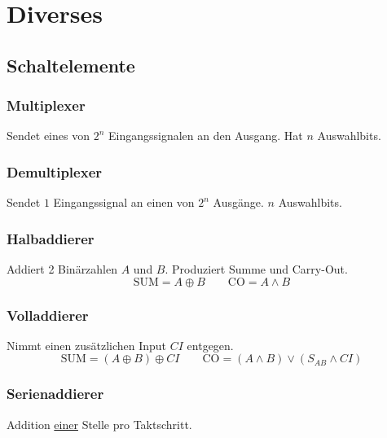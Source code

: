 \section{Diverses}
\subsection{Schaltelemente}
\begin{center}
    \begin{minipage}[t]{0.45\linewidth}
        \subsubsection{Multiplexer}
        Sendet eines von $2^n$ Eingangssignalen an den Ausgang. Hat $n$ Auswahlbits.
    \end{minipage}
    \hfill
    \begin{minipage}[t]{0.45\linewidth}
        \subsubsection{Demultiplexer}
        Sendet $1$ Eingangssignal an einen von $2^n$ Ausgänge. $n$ Auswahlbits.
    \end{minipage}
\end{center}
\subsubsection{Halbaddierer}
Addiert 2 Binärzahlen $A$ und $B$. Produziert Summe und Carry-Out.
\begin{equation*}
    \text{SUM} = A \oplus B \qquad \text{CO} = A \land B
\end{equation*}
\subsubsection{Volladdierer}
Nimmt einen zusätzlichen Input $CI$ entgegen.
\begin{equation*}
    \text{SUM} = (A \oplus B) \oplus CI \qquad \text{CO} = (A \land B) \lor (S_{AB} \land CI) 
\end{equation*}

\subsubsection{Serienaddierer}
Addition \underline{einer} Stelle pro Taktschritt.

